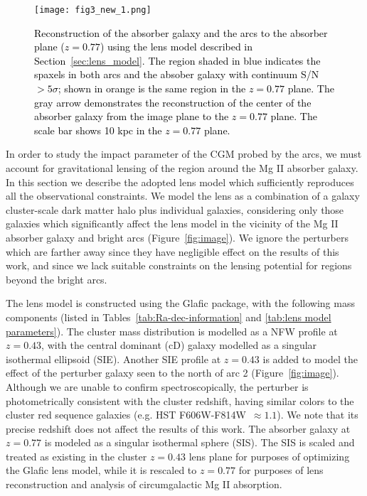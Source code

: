 \documentclass[twocolumn]{aastex62}
\newcommand{\MgII}{Mg\tiny{ }\footnotesize{II}\normalsize{ }}
\newcommand{\TJ}[1]{\textcolor{blue}{TJ: #1}}
\newcommand{\comment}[1]{\textcolor{black}{#1}}
\begin{document}
\begin{figure*}[htb!]

\centerline{
  \texttt{[image: fig3\_new\_1.png]}
}

\caption{
\comment{ 
 Reconstruction of the absorber galaxy and the arcs to the absorber plane ($z=0.77$) using the lens model described in Section~\ref{sec:lens_model}. The region shaded in blue indicates the spaxels in both arcs and the absober galaxy with continuum S/N $>5\sigma$; shown in orange is the same region in the $z=0.77$ plane. The gray arrow demonstrates the reconstruction of the center of the absorber galaxy from the image plane to the $z=0.77$ plane. 
 The scale bar shows 10 kpc in the $z=0.77$ plane.}
} \label{fig:reconstruction}
\end{figure*}

In order to study the impact parameter of the CGM probed by the arcs, we must account for gravitational lensing of the region around the \MgII absorber galaxy. In this section we describe the adopted lens model which sufficiently reproduces all the observational constraints. We model the lens as a combination of a galaxy cluster-scale dark matter halo plus individual galaxies, considering only those galaxies which significantly affect the lens model in the vicinity of the \MgII absorber galaxy and bright arcs (Figure~\ref{fig:image}). 
We ignore the perturbers which are farther away since they have negligible effect on the results of this work, and since we lack suitable constraints on the lensing potential for regions beyond the bright arcs. 



The lens model is constructed using the Glafic \citep{2010Glafic} package, with the following mass components (listed in Tables~\ref{tab:Ra-dec-information} and \ref{tab:lens model parameters}). 
The cluster mass distribution is modelled as a NFW profile \citep{Navarro1997} at $z=0.43$, with the central dominant (cD) galaxy modelled as a singular isothermal ellipsoid (SIE). 
Another SIE profile at $z=0.43$ is added to model the effect of the perturber galaxy seen to the north of arc 2 (Figure~\ref{fig:image}). Although we are unable to confirm spectroscopically, the perturber is photometrically consistent with the cluster redshift, having similar colors to the cluster red sequence galaxies (e.g. HST F606W-F814W~$\approx1.1$). We note that its precise redshift does not affect the results of this work.
The absorber galaxy at $z=0.77$ is modeled as a singular isothermal sphere (SIS). The SIS is scaled and treated as existing in the cluster $z=0.43$ lens plane for purposes of optimizing the Glafic lens model, while it is rescaled to $z=0.77$ for purposes of lens reconstruction and analysis of circumgalactic \MgII absorption. 
\end{document}
